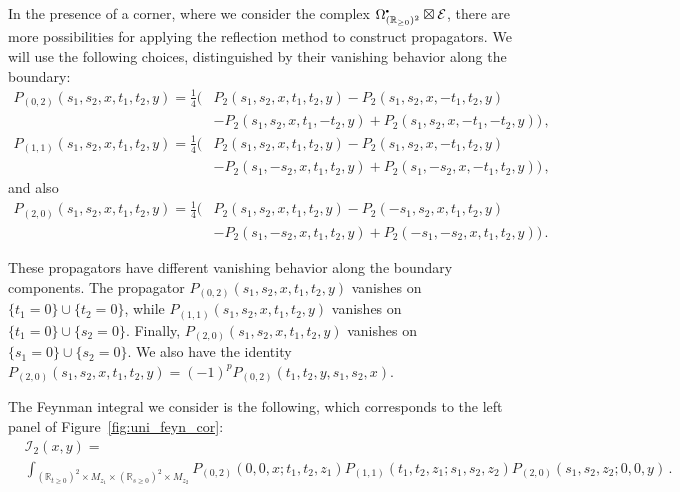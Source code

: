 \documentclass[11pt]{article}
\newcommand{\R}{\mathbb{R}}
\newcommand\sbullet[1][.5]{\mathbin{\vcenter{\hbox{\scalebox{#1}{$\bullet$}}}}}
\numberwithin{equation}{section}
\begin{document}
In the presence of a corner, where we consider the complex $\Omega^{\sbullet}_{(\R_{\geq 0})^2}\boxtimes \mathcal{E}$, there are more possibilities for applying the reflection method to construct propagators. We will use the following choices, distinguished by their vanishing behavior along the boundary:
\begin{equation*}
	\begin{aligned}
			P_{(0,2)}(s_1,s_2,x,t_1,t_2,y) = \frac{1}{4}( &P_2(s_1,s_2,x,t_1,t_2,y)-P_2(s_1,s_2,x,-t_1,t_2,y)  \\
			& - P_2(s_1,s_2,x,t_1,-t_2,y) + P_2(s_1,s_2,x,-t_1,-t_2,y)) \,,\\
				P_{(1,1)}(s_1,s_2,x,t_1,t_2,y) =  \frac{1}{4}(&P_2(s_1,s_2,x,t_1,t_2,y)-P_2(s_1,s_2,x,-t_1,t_2,y) \\
				&- P_2(s_1,-s_2,x,t_1,t_2,y) + P_2(s_1,-s_2,x,-t_1,t_2,y))\,,
	\end{aligned}
\end{equation*}
and also
\begin{equation*}
	\begin{aligned}
			P_{(2,0)}(s_1,s_2,x,t_1,t_2,y) = \frac{1}{4}( &P_2(s_1,s_2,x,t_1,t_2,y)-P_2(-s_1,s_2,x,t_1,t_2,y)  \\
			& - P_2(s_1,-s_2,x,t_1,t_2,y) + P_2(-s_1,-s_2,x,t_1,t_2,y)) \,.
	\end{aligned}
\end{equation*}

These propagators have different vanishing behavior along the boundary components. The propagator $P_{(0,2)}(s_1,s_2,x,t_1,t_2,y)$ vanishes on $\{t_1=0\}\cup\{t_2=0\}$, while $P_{(1,1)}(s_1,s_2,x,t_1,t_2,y)$ vanishes on $\{t_1=0\}\cup\{s_2=0\}$. Finally, $P_{(2,0)}(s_1,s_2,x,t_1,t_2,y)$ vanishes on $\{s_1=0\}\cup\{s_2=0\}$. We also have the identity $P_{(2,0)}(s_1,s_2,x,t_1,t_2,y) = (-1)^pP_{(0,2)}(t_1,t_2,y,s_1,s_2,x)$.


The Feynman integral we consider is the following, which corresponds to the left panel of Figure~\ref{fig:uni_feyn_cor}:
\begin{equation}
	\begin{aligned}
			&\mathcal{I}_2(x,y) = \\
			&\int_{(\R_{t\geq 0})^2\times M_{z_1}\times(\R_{s\geq 0})^2\times M_{z_2}}\!\!\!\! P_{(0,2)}(0,0,x;t_1,t_2,z_1)P_{(1,1)}(t_1,t_2,z_1;s_1,s_2,z_2)P_{(2,0)}(s_1,s_2,z_2;0,0,y)\,.
	\end{aligned}
\end{equation}
\end{document}
